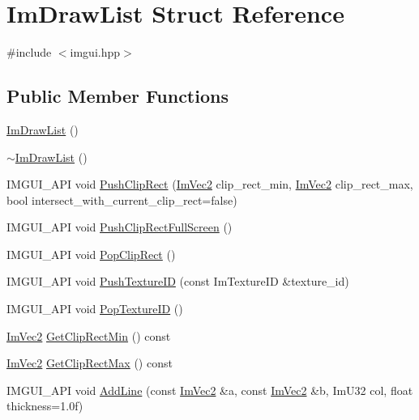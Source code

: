 \hypertarget{struct_im_draw_list}{}\section{Im\+Draw\+List Struct Reference}
\label{struct_im_draw_list}


{\ttfamily \#include $<$imgui.\+hpp$>$}

\subsection*{Public Member Functions}
\begin{DoxyCompactItemize}
\item 
\hyperlink{struct_im_draw_list_a297376db2edb295095171dcc2dbed860}{Im\+Draw\+List} ()
\item 
\hyperlink{struct_im_draw_list_a19fd8d920c202cf8ba5f5c55c43d1d2a}{$\sim$\+Im\+Draw\+List} ()
\item 
I\+M\+G\+U\+I\+\_\+\+A\+PI void \hyperlink{struct_im_draw_list_acb34e2d3708616cae4567f3b4af06962}{Push\+Clip\+Rect} (\hyperlink{struct_im_vec2}{Im\+Vec2} clip\+\_\+rect\+\_\+min, \hyperlink{struct_im_vec2}{Im\+Vec2} clip\+\_\+rect\+\_\+max, bool intersect\+\_\+with\+\_\+current\+\_\+clip\+\_\+rect=false)
\item 
I\+M\+G\+U\+I\+\_\+\+A\+PI void \hyperlink{struct_im_draw_list_a0ab1ab409f0e269755e50a77901bae39}{Push\+Clip\+Rect\+Full\+Screen} ()
\item 
I\+M\+G\+U\+I\+\_\+\+A\+PI void \hyperlink{struct_im_draw_list_a44f40c59ca755f559020f5a7fa81103a}{Pop\+Clip\+Rect} ()
\item 
I\+M\+G\+U\+I\+\_\+\+A\+PI void \hyperlink{struct_im_draw_list_ac0dc0ecf692ab4c6ce58dd5381efb20d}{Push\+Texture\+ID} (const Im\+Texture\+ID \&texture\+\_\+id)
\item 
I\+M\+G\+U\+I\+\_\+\+A\+PI void \hyperlink{struct_im_draw_list_ade9286c5ca58753f7bd571b30e2ff76c}{Pop\+Texture\+ID} ()
\item 
\hyperlink{struct_im_vec2}{Im\+Vec2} \hyperlink{struct_im_draw_list_a9d83896d3eb434a9e1072d56523a2754}{Get\+Clip\+Rect\+Min} () const
\item 
\hyperlink{struct_im_vec2}{Im\+Vec2} \hyperlink{struct_im_draw_list_a8e484a61eab501c1c1c416a8b45bb08e}{Get\+Clip\+Rect\+Max} () const
\item 
I\+M\+G\+U\+I\+\_\+\+A\+PI void \hyperlink{struct_im_draw_list_a6db76ca2506dc86ad4d602fdcd2e2ea8}{Add\+Line} (const \hyperlink{struct_im_vec2}{Im\+Vec2} \&a, const \hyperlink{struct_im_vec2}{Im\+Vec2} \&b, Im\+U32 col, float thickness=1.\+0f)

\end{DoxyCompactItemize}
